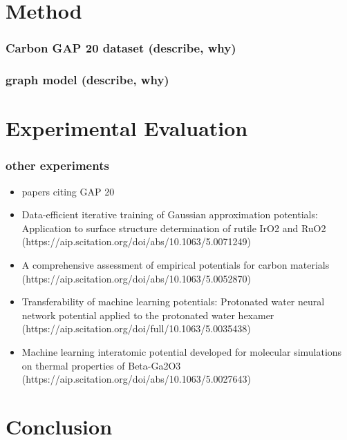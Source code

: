 \documentclass[12pt]{scrartcl}
\begin{document}




\newpage 

\section{Method}
\subsubsection{Carbon GAP 20 dataset (describe, why)}  
\subsubsection{graph model (describe, why)}  

\newpage

\section{Experimental Evaluation}
\subsubsection{other experiments}  
\begin{itemize}
    \item papers citing GAP 20
    \item Data-efficient iterative training of Gaussian approximation potentials: Application to surface structure determination of rutile IrO2 and RuO2 (https://aip.scitation.org/doi/abs/10.1063/5.0071249)
    \item A comprehensive assessment of empirical potentials for carbon materials (https://aip.scitation.org/doi/abs/10.1063/5.0052870)
    \item Transferability of machine learning potentials: Protonated water neural network potential applied to the protonated water hexamer (https://aip.scitation.org/doi/full/10.1063/5.0035438)
    \item Machine learning interatomic potential developed for molecular simulations on thermal properties of Beta-Ga2O3 (https://aip.scitation.org/doi/abs/10.1063/5.0027643)
\end{itemize}
\newpage

\section{Conclusion}

\newpage



\end{document}
